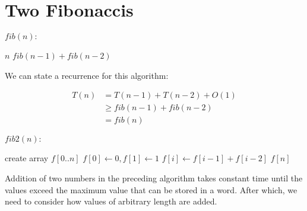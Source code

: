 \chapter{Two Fibonaccis}

$fib(n):$
\begin{algorithmic}
\RETURN $n$
\ELSE
\RETURN $fib(n-1) + fib(n-2)$
\ENDIF
\end{algorithmic}

We can state a recurrence for this algorithm:

\begin{align*}
T(n) 
&= T(n-1) + T(n-2) + O(1) \\
&\geq fib(n-1) + fib(n-2) \\
&= fib(n)
\end{align*}

$fib2(n):$
\begin{algorithmic}
\ENDIF
\STATE create array $f[0 .. n]$
\STATE $f[0] \leftarrow 0, f[1] \leftarrow 1$
\STATE $f[i] \leftarrow f[i-1] + f[i-2]$
\ENDFOR
\RETURN $f[n]$
\end{algorithmic}

Addition of two numbers in the preceding algorithm takes constant time
until the values exceed the maximum value that can be stored in a
word.  After which, we need to consider how values of arbitrary length
are added.

